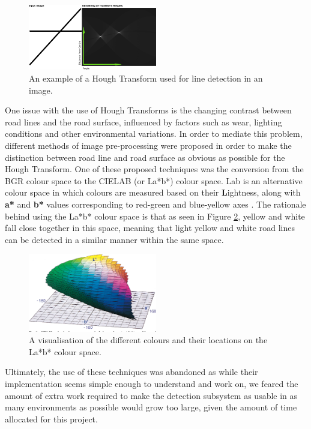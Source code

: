 \documentclass[titlepage,draft]{article}
\begin{document}
\begin{figure}
	\centering
	\includegraphics[width=0.5\textwidth]{Hough-example}
	\caption{An example of a Hough Transform used for line detection in an image.}
	\label{HoughTransform}
\end{figure}

One issue with the use of Hough Transforms is the changing contrast between road lines and the road surface, influenced by
factors such as wear, lighting conditions and other environmental variations.
In order to mediate this problem, different methods of image pre-processing were proposed in order to make the distinction
between road line and road surface as obvious as possible for the Hough Transform.
One of these proposed techniques was the conversion from the BGR colour space to the CIELAB (or La*b*) colour space.
La\*b\* is an alternative colour space in which colours are measured based on their \textbf{L}ightness, along with \textbf{a*} and
\textbf{b*} values corresponding to red-green and blue-yellow axes \cite{Mclaren2008}.
The rationale behind using the La*b* colour space is that as seen in Figure \ref{LabColourSpace}, yellow and white fall close
together in this space, meaning that light yellow and white road lines can be detected in a similar manner within the same space.

\begin{figure}
	\centering
	\includegraphics[width=0.5\textwidth]{Lab-colour-space}
	\caption{A visualisation of the different colours and their locations on the La*b* colour space.}
	\label{LabColourSpace}
\end{figure}

Ultimately, the use of these techniques was abandoned as while their implementation seems simple enough to understand and work
on, we feared the amount of extra work required to make the detection subsystem as usable in as many environments as possible
would grow too large, given the amount of time allocated for this project.
\end{document}
